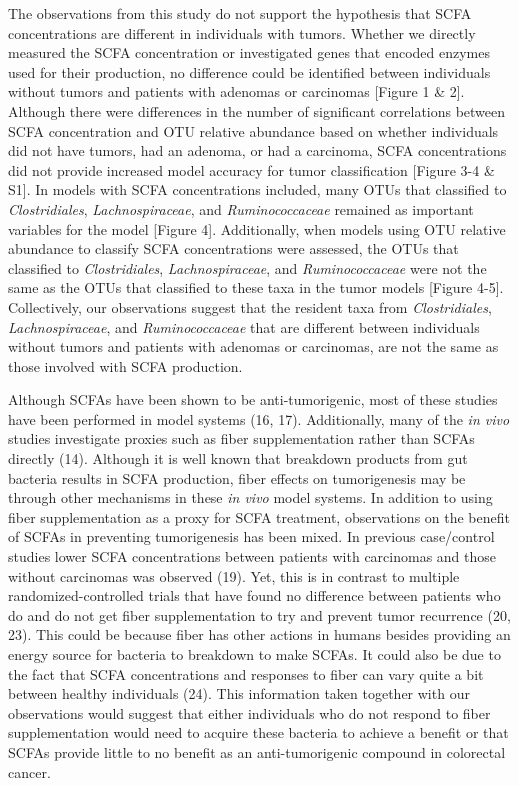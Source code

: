 \documentclass[11pt,]{article}
\begin{document}
The observations from this study do not support the hypothesis that SCFA
concentrations are different in individuals with tumors. Whether we
directly measured the SCFA concentration or investigated genes that
encoded enzymes used for their production, no difference could be
identified between individuals without tumors and patients with adenomas
or carcinomas {[}Figure 1 \& 2{]}. Although there were differences in
the number of significant correlations between SCFA concentration and
OTU relative abundance based on whether individuals did not have tumors,
had an adenoma, or had a carcinoma, SCFA concentrations did not provide
increased model accuracy for tumor classification {[}Figure 3-4 \&
S1{]}. In models with SCFA concentrations included, many OTUs that
classified to \emph{Clostridiales}, \emph{Lachnospiraceae}, and
\emph{Ruminococcaceae} remained as important variables for the model
{[}Figure 4{]}. Additionally, when models using OTU relative abundance
to classify SCFA concentrations were assessed, the OTUs that classified
to \emph{Clostridiales}, \emph{Lachnospiraceae}, and
\emph{Ruminococcaceae} were not the same as the OTUs that classified to
these taxa in the tumor models {[}Figure 4-5{]}. Collectively, our
observations suggest that the resident taxa from \emph{Clostridiales},
\emph{Lachnospiraceae}, and \emph{Ruminococcaceae} that are different
between individuals without tumors and patients with adenomas or
carcinomas, are not the same as those involved with SCFA production.

Although SCFAs have been shown to be anti-tumorigenic, most of these
studies have been performed in model systems (16, 17). Additionally,
many of the \emph{in vivo} studies investigate proxies such as fiber
supplementation rather than SCFAs directly (14). Although it is well
known that breakdown products from gut bacteria results in SCFA
production, fiber effects on tumorigenesis may be through other
mechanisms in these \emph{in vivo} model systems. In addition to using
fiber supplementation as a proxy for SCFA treatment, observations on the
benefit of SCFAs in preventing tumorigenesis has been mixed. In previous
case/control studies lower SCFA concentrations between patients with
carcinomas and those without carcinomas was observed (19). Yet, this is
in contrast to multiple randomized-controlled trials that have found no
difference between patients who do and do not get fiber supplementation
to try and prevent tumor recurrence (20, 23). This could be because
fiber has other actions in humans besides providing an energy source for
bacteria to breakdown to make SCFAs. It could also be due to the fact
that SCFA concentrations and responses to fiber can vary quite a bit
between healthy individuals (24). This information taken together with
our observations would suggest that either individuals who do not
respond to fiber supplementation would need to acquire these bacteria to
achieve a benefit or that SCFAs provide little to no benefit as an
anti-tumorigenic compound in colorectal cancer.
\end{document}
